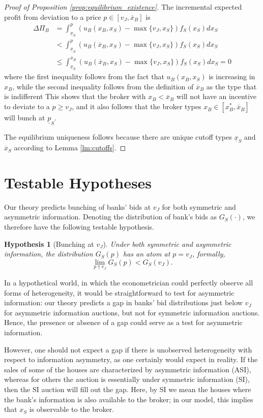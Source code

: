 \documentclass[11pt,twopage]{article}
\newcommand{\ol}{\overline}
\newcommand{\ul}{\underline}
\newtheorem{conjecture}{Hypothesis}
{\bf}{\it}
\begin{document}
\begin{proof}[Proof of Proposition \ref{prop:equilibrium_existence}]
The incremental expected profit from deviation to a price $p \in [v_J,\ol x_B]$ is
\begin{align*}
\Delta \Pi_B &= \int_{\ul x_S}^{p} (u_B(x_B,x_S) - \max \{ v_J, x_S \}) f_S(x_S) dx_S
\\
&< \int_{\ul x_S}^{p} (u_B(\ol x_B,x_S) - \max \{ v_J, x_S \}) f_S(x_S) dx_S
\\
&\leq \int_{\ul x_S}^{\ol x_B} (u_B(\ol x_B,x_S) - \max \{ v_J, x_S \}) f_S(x_S) dx_S=0
\end{align*}
where the first inequality follows from the fact that $u_B(x_B,x_S)$ is increasing in $x_B$, while the second inequality follows from the definition of $\ol x_B$ as the type that is indifferent This shows that the broker with $x_B <  \ol x_B$ will not have an incentive to deviate to a $p\geq v_J$, and it also follows that the broker types $x_B \in [x_B^*,\ol x_B]$ will bunch at $\ul p_S$.
%


The  equilibrium uniqueness follows because there are unique cutoff types $\underline x_S$ and $\overline x_S$ according to Lemma \ref{lm:cutoffs}.
\end{proof}






\section{Testable Hypotheses}
\label{sec:empir-pred}

Our theory predicts bunching of banks' bids at $v_J$ for both symmetric and asymmetric information. Denoting the distribution of bank's bids as $G_S(\cdot)$, we therefore have the following testable hypothesis.
\begin{conjecture}[Bunching at $v_J$]\label{hyp:bunching}
Under both symmetric and asymmetric information, the distribution $G_S(p)$ has an atom at $p = v_J$, formally, 
\[
\lim_{p\uparrow v_J} G_S(p) <G_S(v_J).
\]
\end{conjecture}

In a hypothetical world, in which the econometrician could perfectly observe all forms of heterogeneity, it would be straightforward to test for asymmetric information: our theory predicts a gap in banks' bid distributions just below $v_J$ for asymmetric information auctions, but not for symmetric information auctions. Hence, the presence or absence of a gap could serve as a test for asymmetric information.

However, one should not expect a gap if there is unobserved heterogeneity with respect to
information asymmetry, as one certainly would expect in reality. If the sales of some of the houses are characterized by asymmetric information (ASI), whereas for others the auction is essentially under symmetric information (SI), then the SI auction will fill out the gap. Here, by SI we mean the houses where the bank's information is also available to the broker; in our model, this implies that $x_S$ is observable to the broker.
\end{document}
